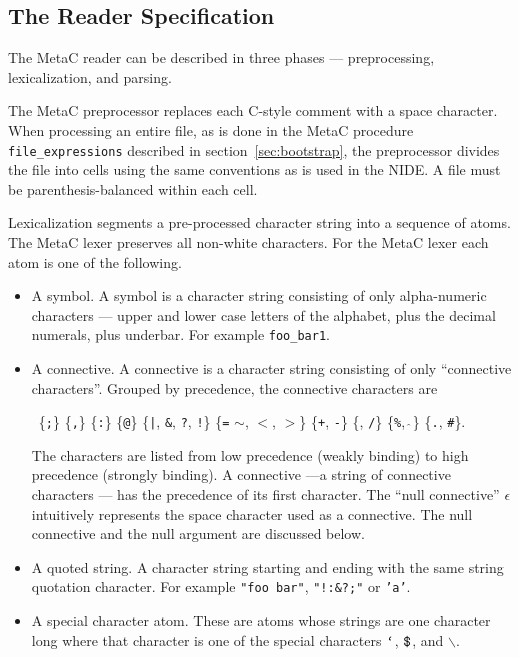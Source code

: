 \documentclass{article}
\newcommand{\mtt}[1]{\mbox{\tt #1}}
\begin{document}
\subsection{The Reader Specification}
\label{sec:reader}

The MetaC reader can be described in three phases --- preprocessing, lexicalization, and parsing.

The MetaC preprocessor replaces each C-style comment with a space character.  When processing an entire file,
as is done in the MetaC procedure {\tt file\_expressions}
described in section~\ref{sec:bootstrap}, the preprocessor divides the file into
cells using the same conventions as is used in the NIDE.
A file must be parenthesis-balanced within each cell.

Lexicalization segments a pre-processed character string into a sequence of atoms.
The MetaC lexer preserves all non-white characters.  For the MetaC lexer each atom is one of the following.

\begin{itemize}
\item A symbol.  A symbol is a character string consisting of only alpha-numeric characters --- upper and lower case letters of the alphabet, plus the decimal numerals, plus underbar.
  For example {\tt foo\_bar1}.
\item A connective.  A connective is a character string consisting of only ``connective characters''.
  Grouped by precedence, the connective characters are
  
  \medskip
  \centerline{~\;\;\;\;\;\;\{\mtt{;}\} \{\mtt{,}\} \{\mtt{:}\} \{\mtt{@}\}
  \{{\tt |}, {\tt \&}, {\tt ?}, {\tt !}\} \{{\tt =} {\tt $\sim$}, {\tt $<$}, {\tt $>$}\} \{{\tt +}, {\tt -}\}
  \{{\tt *}, {\tt /}\} \{{\tt \%}, $\hat{~}$\} \{{\tt .}, {\tt \#}\}.}
  
  \medskip
  The characters are listed from low precedence (weakly binding) to high precedence (strongly binding). A connective
  ---a string of connective characters --- has the precedence of its first character.  The ``null connective'' $\epsilon$
  intuitively represents the space character used as a connective.  The null connective and the null argument are discussed below.
\item A quoted string.  A character string starting and ending with the same string quotation character.  For example {\tt "foo bar"}, {\tt "!:\&?;"} or {\tt 'a'}.
\item A special character atom. These are atoms whose strings are one character long where that character is one of
  the special characters $\mtt{`}$, $\mtt{\$}$, and $\backslash$.
\end{itemize}
\end{document}
